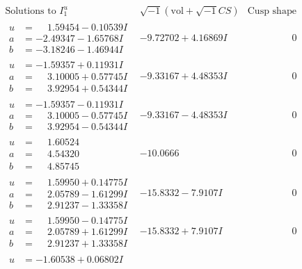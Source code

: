 \documentclass[1p]{elsarticle_modified}
\theoremstyle{definition}
\newcommand{\I}{\sqrt{-1}}
\begin{document}
$$\begin{array}{c|c|c}
\text{Solutions to }I^u_{1}& \I (\text{vol} + \sqrt{-1}CS) & \text{Cusp shape}\\
 \hline 
\begin{aligned}
u &= \phantom{-}1.59454 - 0.10539 I \\
a &= -2.49347 - 1.65768 I \\
b &= -3.18246 - 1.46944 I\end{aligned}
 & -9.72702 + 4.16869 I & \phantom{-0.000000 } 0 \\ \hline\begin{aligned}
u &= -1.59357 + 0.11931 I \\
a &= \phantom{-}3.10005 + 0.57745 I \\
b &= \phantom{-}3.92954 + 0.54344 I\end{aligned}
 & -9.33167 + 4.48353 I & \phantom{-0.000000 } 0 \\ \hline\begin{aligned}
u &= -1.59357 - 0.11931 I \\
a &= \phantom{-}3.10005 - 0.57745 I \\
b &= \phantom{-}3.92954 - 0.54344 I\end{aligned}
 & -9.33167 - 4.48353 I & \phantom{-0.000000 } 0 \\ \hline\begin{aligned}
u &= \phantom{-}1.60524\phantom{ +0.000000I} \\
a &= \phantom{-}4.54320\phantom{ +0.000000I} \\
b &= \phantom{-}4.85745\phantom{ +0.000000I}\end{aligned}
 & -10.0666\phantom{ +0.000000I} & \phantom{-0.000000 } 0 \\ \hline\begin{aligned}
u &= \phantom{-}1.59950 + 0.14775 I \\
a &= \phantom{-}2.05789 - 1.61299 I \\
b &= \phantom{-}2.91237 - 1.33358 I\end{aligned}
 & -15.8332 - 7.9107 I & \phantom{-0.000000 } 0 \\ \hline\begin{aligned}
u &= \phantom{-}1.59950 - 0.14775 I \\
a &= \phantom{-}2.05789 + 1.61299 I \\
b &= \phantom{-}2.91237 + 1.33358 I\end{aligned}
 & -15.8332 + 7.9107 I & \phantom{-0.000000 } 0 \\ \hline\begin{aligned}
u &= -1.60538 + 0.06802 I \\

\end{aligned}
\end{array}$$
\end{document}
